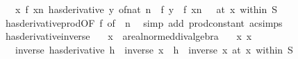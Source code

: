 \begin{isabellebody}
\ \ \ {\isachardoublequoteopen}{\isacharparenleft}{\kern0pt}{\isacharparenleft}{\kern0pt}{\isasymlambda}x{\isachardot}{\kern0pt}\ f\ x{\isacharcircum}{\kern0pt}n{\isacharparenright}{\kern0pt}\ has{\isacharunderscore}{\kern0pt}derivative\ {\isacharparenleft}{\kern0pt}{\isasymlambda}y{\isachardot}{\kern0pt}\ of{\isacharunderscore}{\kern0pt}nat\ n\ {\isacharasterisk}{\kern0pt}\ f{\isacharprime}{\kern0pt}\ y\ {\isacharasterisk}{\kern0pt}\ f\ x{\isacharcircum}{\kern0pt}{\isacharparenleft}{\kern0pt}n\ {\isacharminus}{\kern0pt}\ {}{\isacharparenright}{\kern0pt}{\isacharparenright}{\kern0pt}{\isacharparenright}{\kern0pt}\ {\isacharparenleft}{\kern0pt}at\ x\ within\ S{\isacharparenright}{\kern0pt}{\isachardoublequoteclose}\isanewline
%
\isadelimproof
\ \ %
\endisadelimproof
%
\isatagproof
{}\isamarkupfalse%
\ has{\isacharunderscore}{\kern0pt}derivative{\isacharunderscore}{\kern0pt}prod{\isacharbrackleft}{\kern0pt}OF\ f{\isacharcomma}{\kern0pt}\ of\ {\isachardoublequoteopen}{\isacharbraceleft}{\kern0pt}{\isachardot}{\kern0pt}{\isachardot}{\kern0pt}{\isacharless}{\kern0pt}\ n{\isacharbraceright}{\kern0pt}{\isachardoublequoteclose}{\isacharbrackright}{\kern0pt}\ \isamarkupfalse%
\ {\isacharparenleft}{\kern0pt}simp\ add{\isacharcolon}{\kern0pt}\ prod{\isacharunderscore}{\kern0pt}constant\ ac{\isacharunderscore}{\kern0pt}simps{\isacharparenright}{\kern0pt}%
\endisatagproof
{\isafoldproof}%
%
\isadelimproof
\isanewline
%
\endisadelimproof
\isanewline
{}\isamarkupfalse%
\ has{\isacharunderscore}{\kern0pt}derivative{\isacharunderscore}{\kern0pt}inverse{\isacharprime}{\kern0pt}{\isacharcolon}{\kern0pt}\isanewline
\ \ \ x\ {\isacharcolon}{\kern0pt}{\isacharcolon}{\kern0pt}\ {\isachardoublequoteopen}{\isacharprime}{\kern0pt}a{\isacharcolon}{\kern0pt}{\isacharcolon}{\kern0pt}real{\isacharunderscore}{\kern0pt}normed{\isacharunderscore}{\kern0pt}div{\isacharunderscore}{\kern0pt}algebra{\isachardoublequoteclose}\isanewline
\ \ \ x{\isacharcolon}{\kern0pt}\ {\isachardoublequoteopen}x\ {\isasymnoteq}\ {}{\isachardoublequoteclose}\isanewline
\ \ \ {\isachardoublequoteopen}{\isacharparenleft}{\kern0pt}inverse\ has{\isacharunderscore}{\kern0pt}derivative\ {\isacharparenleft}{\kern0pt}{\isasymlambda}h{\isachardot}{\kern0pt}\ {\isacharminus}{\kern0pt}\ {\isacharparenleft}{\kern0pt}inverse\ x\ {\isacharasterisk}{\kern0pt}\ h\ {\isacharasterisk}{\kern0pt}\ inverse\ x{\isacharparenright}{\kern0pt}{\isacharparenright}{\kern0pt}{\isacharparenright}{\kern0pt}\ {\isacharparenleft}{\kern0pt}at\ x\ within\ S{\isacharparenright}{\kern0pt}{\isachardoublequoteclose}\isanewline

\end{isabellebody}
